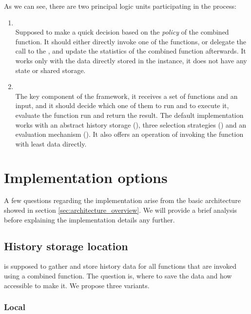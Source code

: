 As we can see, there are two principal logic units participating in the process:

\begin{enumerate}
	\item \textbf{} \\
	Supposed to make a quick decision based on the \textit{policy} of the combined function. It should either directly invoke one of the functions, or delegate the call to the , and update the statistics of the combined function afterwards. It works only with the data directly stored in the  instance, it does not have any state or shared storage.
	\item \textbf{} \\
	The key component of the framework, it receives a set of functions and an input, and it should decide which one of them to run and to execute it, evaluate the function run and return the result. The default implementation works with an abstract history storage (), three selection strategies () and an evaluation mechanism (). It also offers an operation of invoking the function with least data directly.
\end{enumerate}

\section{Implementation options}

A few questions regarding the implementation arise from the basic architecture showed in section \ref{sec:architecture_overview}. We will provide a brief analysis before explaining the implementation details any further.

\subsection{History storage location}
\label{subsec:storing}

 is supposed to gather and store history data for all functions that are invoked using a combined function. The question is, where to save the data and how accessible to make it. We propose three variants.

\subsubsection{Local}

